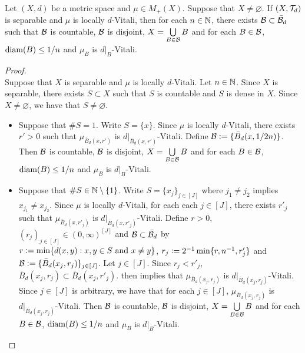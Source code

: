 \documentclass{book}
\begin{document}
	\begin{ex}
		Let $(X, d)$ be a metric space and $\mu \in M_+(X)$. Suppose that $X \neq \varnothing$. If $(X, \mathcal{T}_d)$ is separable and $\mu$ is locally $d$-Vitali, then for each $n \in \mathbb{N}$, there exists $\mathcal{B} \subset \bar{\mathcal{B}}_d$ such that $\mathcal{B}$ is countable, $\mathcal{B}$ is disjoint, $X = \bigcup\limits_{B \in \mathcal{B}} B$ and for each $B \in \mathcal{B}$, $\operatorname{\text{diam}}(B) \leq 1/n$ and $\mu_B$ is $d|_B$-Vitali. 
	\end{ex}
	
	\begin{proof}
		 \\
		Suppose that $X$ is separable and $\mu$ is locally $d$-Vitali. Let $n \in \mathbb{N}$. Since $X$ is separable, there exists $S \subset X$ such that $S$ is countable and $S$ is dense in $X$. Since $X \neq \varnothing$, we have that $S \neq \varnothing$.
		\begin{itemize}
			\item Suppose that $\# S = 1$. Write $S = \{x\}$. Since $\mu$ is locally $d$-Vitali, there exists $r' > 0$ such that $\mu_{\bar{B}_d(x, r')}$ is $d|_{\bar{B}_d(x, r')}$-Vitali. Define $\mathcal{B} \vcentcolon= \{\bar{B}_d(x, 1/2n)\}$. Then $\mathcal{B}$ is countable, $\mathcal{B}$ is disjoint, $X = \bigcup\limits_{B \in \mathcal{B}} B$ and for each $B \in \mathcal{B}$, $\operatorname{\text{diam}}(B) \leq 1/n$ and $\mu_B$ is $d|_B$-Vitali. 
			\item Suppose that $\# S \in \mathbb{N} \setminus \{1\}$. Write $S = \{x_j\}_{j \in [J]}$ where $j_1 \neq j_2$ implies $x_{j_1} \neq x_{j_2}$. Since $\mu$ is locally $d$-Vitali, for each each $j \in [J]$, there exists $r'_j$ such that $\mu_{\bar{B}_d(x, r'_j)}$ is $d|_{\bar{B}_d(x, r'_j)}$-Vitali. Define $r > 0$, $(r_j)_{j \in [J]} \in (0, \infty)^{[J]}$ and $\mathcal{B} \subset \bar{\mathcal{B}}_d$ by $r \vcentcolon= \min\{d(x, y): \text{$x,y \in S$ and $x \neq y$}\}$, $r_j \vcentcolon= 2^{-1}\min\{r, n^{-1}, r'_j\}$ and $\mathcal{B} \vcentcolon= \{\bar{B}_d(x_j, r_j)\}_{j \in [J]}$. Let $j \in [J]$. Since $r_j < r'_j$, $\bar{B}_d(x_j, r_j) \subset \bar{B}_d(x_j, r'_j)$.  then implies that $\mu_{\bar{B}_d(x_j, r_j)}$ is $d|_{\bar{B}_d(x_j, r_j)}$-Vitali. Since $j \in [J]$ is arbitrary, we have that for each $j \in [J]$, $\mu_{\bar{B}_d(x_j, r_j)}$ is $d|_{\bar{B}_d(x_j, r_j)}$-Vitali. Then $\mathcal{B}$ is countable, $\mathcal{B}$ is disjoint, $X = \bigcup\limits_{B \in \mathcal{B}} B$ and for each $B \in \mathcal{B}$, $\operatorname{\text{diam}}(B) \leq 1/n$ and $\mu_B$ is $d|_{B}$-Vitali. 

\end{itemize}
\end{proof}
\end{document}
